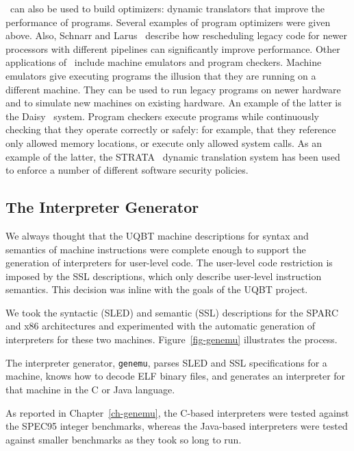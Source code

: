 \walk\ can also be used to build optimizers:
dynamic translators that improve the performance of programs.
Several examples of program optimizers were given above.
Also, Schnarr and Larus~\cite{Schn96} describe how
rescheduling legacy code for newer processors with different pipelines
can significantly improve performance.
Other applications of \walk\ include machine emulators and program checkers.
Machine emulators give executing programs
the illusion that they are running on a different machine.
They can be used to run legacy programs on newer hardware
and to simulate new machines on existing hardware.
An example of the latter is the Daisy~\cite{Ebci96} system.
Program checkers execute programs while continuously checking
that they operate correctly or safely:
for example, that they reference only allowed memory locations,
or execute only allowed system calls.
As an example of the latter,
the STRATA~\cite{Scot01} dynamic translation system has been used to
enforce a number of different software security policies.


\subsection{The Interpreter Generator}

We always thought that the UQBT machine descriptions for syntax and 
semantics of machine instructions were complete enough to support 
the generation of interpreters for user-level code.
The user-level code restriction is imposed by the SSL descriptions, 
which only describe user-level instruction semantics.  This decision 
was inline with the goals of the UQBT project. 

We took the syntactic (SLED) and semantic (SSL) descriptions 
for the SPARC and x86 architectures and experimented with the 
automatic generation of interpreters for these two machines.  
Figure~\ref{fig-genemu} illustrates the process. 


The interpreter generator, \texttt{genemu}, parses SLED and SSL 
specifications for a machine, knows how to decode ELF binary 
files, and generates an interpreter for that machine in the 
C or Java language.  

As reported in Chapter~\ref{ch-genemu}, the C-based interpreters 
were tested against the SPEC95 integer benchmarks, whereas the
Java-based interpreters were tested against smaller benchmarks 
as they took so long to run. 

